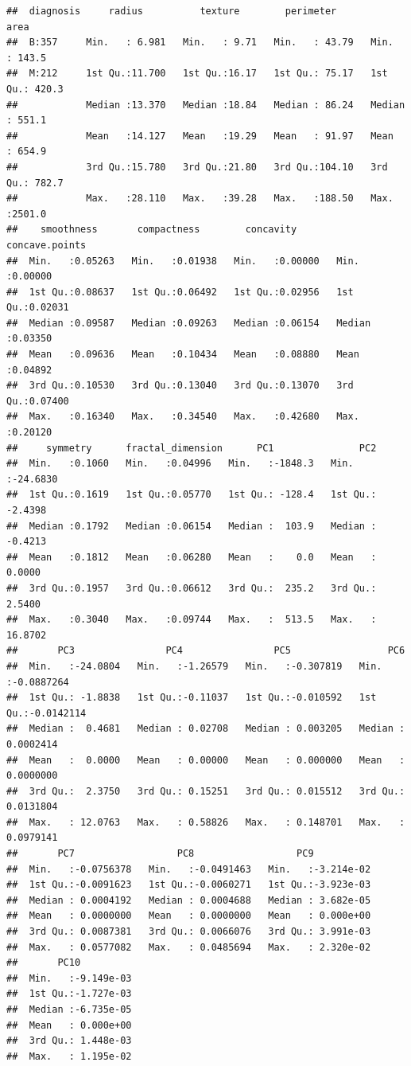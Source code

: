 \documentclass[
  11pt,
]{article}
\begin{document}
\begin{verbatim}
##  diagnosis     radius          texture        perimeter           area       
##  B:357     Min.   : 6.981   Min.   : 9.71   Min.   : 43.79   Min.   : 143.5  
##  M:212     1st Qu.:11.700   1st Qu.:16.17   1st Qu.: 75.17   1st Qu.: 420.3  
##            Median :13.370   Median :18.84   Median : 86.24   Median : 551.1  
##            Mean   :14.127   Mean   :19.29   Mean   : 91.97   Mean   : 654.9  
##            3rd Qu.:15.780   3rd Qu.:21.80   3rd Qu.:104.10   3rd Qu.: 782.7  
##            Max.   :28.110   Max.   :39.28   Max.   :188.50   Max.   :2501.0  
##    smoothness       compactness        concavity       concave.points   
##  Min.   :0.05263   Min.   :0.01938   Min.   :0.00000   Min.   :0.00000  
##  1st Qu.:0.08637   1st Qu.:0.06492   1st Qu.:0.02956   1st Qu.:0.02031  
##  Median :0.09587   Median :0.09263   Median :0.06154   Median :0.03350  
##  Mean   :0.09636   Mean   :0.10434   Mean   :0.08880   Mean   :0.04892  
##  3rd Qu.:0.10530   3rd Qu.:0.13040   3rd Qu.:0.13070   3rd Qu.:0.07400  
##  Max.   :0.16340   Max.   :0.34540   Max.   :0.42680   Max.   :0.20120  
##     symmetry      fractal_dimension      PC1               PC2          
##  Min.   :0.1060   Min.   :0.04996   Min.   :-1848.3   Min.   :-24.6830  
##  1st Qu.:0.1619   1st Qu.:0.05770   1st Qu.: -128.4   1st Qu.: -2.4398  
##  Median :0.1792   Median :0.06154   Median :  103.9   Median : -0.4213  
##  Mean   :0.1812   Mean   :0.06280   Mean   :    0.0   Mean   :  0.0000  
##  3rd Qu.:0.1957   3rd Qu.:0.06612   3rd Qu.:  235.2   3rd Qu.:  2.5400  
##  Max.   :0.3040   Max.   :0.09744   Max.   :  513.5   Max.   : 16.8702  
##       PC3                PC4                PC5                 PC6            
##  Min.   :-24.0804   Min.   :-1.26579   Min.   :-0.307819   Min.   :-0.0887264  
##  1st Qu.: -1.8838   1st Qu.:-0.11037   1st Qu.:-0.010592   1st Qu.:-0.0142114  
##  Median :  0.4681   Median : 0.02708   Median : 0.003205   Median : 0.0002414  
##  Mean   :  0.0000   Mean   : 0.00000   Mean   : 0.000000   Mean   : 0.0000000  
##  3rd Qu.:  2.3750   3rd Qu.: 0.15251   3rd Qu.: 0.015512   3rd Qu.: 0.0131804  
##  Max.   : 12.0763   Max.   : 0.58826   Max.   : 0.148701   Max.   : 0.0979141  
##       PC7                  PC8                  PC9            
##  Min.   :-0.0756378   Min.   :-0.0491463   Min.   :-3.214e-02  
##  1st Qu.:-0.0091623   1st Qu.:-0.0060271   1st Qu.:-3.923e-03  
##  Median : 0.0004192   Median : 0.0004688   Median : 3.682e-05  
##  Mean   : 0.0000000   Mean   : 0.0000000   Mean   : 0.000e+00  
##  3rd Qu.: 0.0087381   3rd Qu.: 0.0066076   3rd Qu.: 3.991e-03  
##  Max.   : 0.0577082   Max.   : 0.0485694   Max.   : 2.320e-02  
##       PC10           
##  Min.   :-9.149e-03  
##  1st Qu.:-1.727e-03  
##  Median :-6.735e-05  
##  Mean   : 0.000e+00  
##  3rd Qu.: 1.448e-03  
##  Max.   : 1.195e-02
\end{verbatim}
\end{document}
